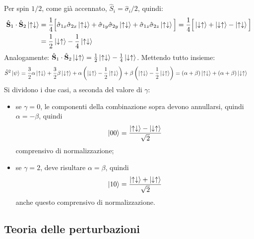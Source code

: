 \documentclass[11pt, a4paper]{scrartcl} %
\numberwithin{equation}{subsection}
\theoremstyle{style2}
\theoremstyle{style1}
\begin{document}
\begin{enumerate}[(1).]
Per spin $ 1 / 2$, come gi\`a accennato, $\hat{S}_i = \hat{\sigma }_i / 2$, quindi:
\[
\begin{split}
	\hat{\mathbf{S} }_1 \cdot \hat{\mathbf{S} }_2 \ket{\uparrow\downarrow} &= \frac{1}{4}\Big[\hat{\sigma }_{1x} \hat{\sigma }_{2x} \ket{\uparrow\downarrow} + \hat{\sigma }_{1y} \hat{\sigma }_{2y} \ket{\uparrow\downarrow} + \hat{\sigma }_{1z} \hat{\sigma }_{2z} \ket{\uparrow \downarrow} \Big] = \frac{1}{4} \Big[\ket{\downarrow\uparrow} + \ket{\downarrow\uparrow} - \ket{\uparrow\downarrow} \Big]\\
									       &= \frac{1}{2}\ket{\downarrow\uparrow} - \frac{1}{4} \ket{\uparrow\downarrow} 
\end{split}
\] 
Analogamente: $\hat{\mathbf{S} }_1 \cdot \hat{\mathbf{S} }_2 \ket{\downarrow\uparrow}  = \frac{1}{2}\ket{\uparrow\downarrow} -\frac{1}{4}\ket{\downarrow\uparrow}  $.
Mettendo tutto insieme:
\[
\begin{split}
	\hat{S}^2 \ket{\psi } &= \frac{3}{2}\alpha  \ket{\uparrow\downarrow} + \frac{3}{2} \beta \ket{\downarrow\uparrow} +\alpha  \left(\ket{\downarrow\uparrow} -\frac{1}{2}\ket{\uparrow\downarrow} \right) + \beta \left(\ket{\uparrow\downarrow} -\frac{1}{2}\ket{\downarrow\uparrow} \right) = (\alpha +\beta ) \ket{\uparrow\downarrow} + (\alpha +\beta ) \ket{\downarrow\uparrow} 
\end{split}
\] 
Si dividono i due casi, a seconda del valore di $\gamma$:
\begin{itemize}
	\item se $\gamma=0$, le componenti della combinazione sopra devono annullarsi, quindi $\alpha  = - \beta $, quindi
		\begin{equation}
			\ket{00} = \frac{\ket{\uparrow\downarrow} - \ket{\downarrow\uparrow} }{\sqrt{2} }
		\end{equation}
		comprensivo di normalizzazione;
	\item se $\gamma=2$, deve risultare $\alpha = \beta $, quindi
		\begin{equation}
			\ket{10}  = \frac{\ket{\uparrow \downarrow} + \ket{\downarrow\uparrow} }{\sqrt{2} }
		\end{equation}
		anche questo comprensivo di normalizzazione.
\end{itemize}
\end{enumerate}

\subsection{Teoria delle perturbazioni}
\end{document}
